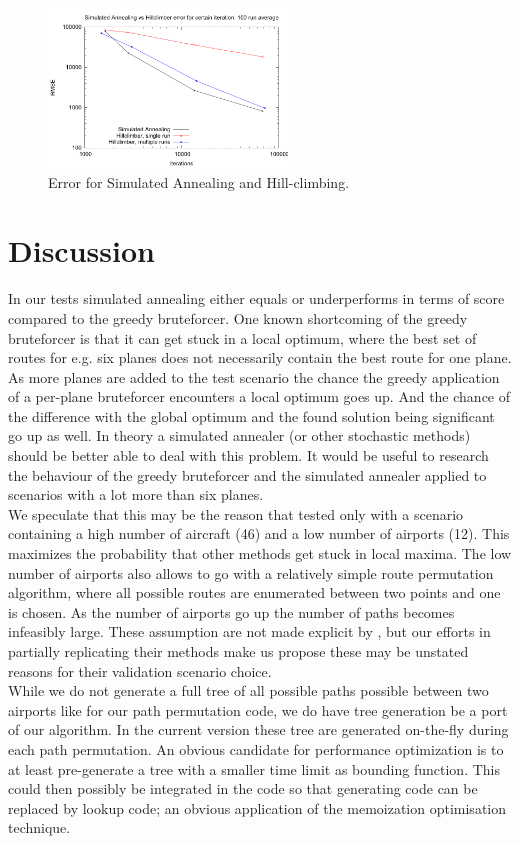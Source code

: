\documentclass[journal]{IEEEtran}
\begin{document}
\begin{figure}[H]
\centering
\includegraphics[width=2.5in]{iterations_vs_error_sa_hc}
\caption{Error for Simulated Annealing and Hill-climbing.\tiny}
\label{fig:error_sa_hc}
\end{figure}

\section{Discussion}
In our tests simulated annealing either equals or underperforms in terms of score compared to the greedy bruteforcer. One known shortcoming of the greedy bruteforcer is that it can get stuck in a local optimum, where the best set of routes for e.g. six planes does not necessarily contain the best route for one plane. As more planes are added to the test scenario the chance the greedy application of a per-plane bruteforcer encounters a local optimum goes up. And the chance of the difference with the global optimum and the found solution being significant go up as well. In theory a simulated annealer (or other stochastic methods) should be better able to deal with this problem. It would be useful to research the behaviour of the greedy bruteforcer and the simulated annealer applied to scenarios with a lot more than six planes. \\
We speculate that this may be the reason that \cite{Mashford2001} tested only with a scenario containing a high number of aircraft (46) and a low number of airports (12). This maximizes the probability that other methods get stuck in local maxima. The low number of airports also allows \cite{Mashford2001} to go with a relatively simple route permutation algorithm, where all possible routes are enumerated between two points and one is chosen. As the number of airports go up the number of paths becomes infeasibly large. These assumption are not made explicit by \cite{Mashford2001}, but our efforts in partially replicating their methods make us propose these may be unstated reasons for their validation scenario choice. \\
While we do not generate a full tree of all possible paths possible between two airports like \cite{Mashford2001} for our path permutation code, we do have tree generation be a port of our algorithm. In the current version these tree are generated on-the-fly during each path permutation. An obvious candidate for performance optimization is to at least pre-generate a tree with a smaller time limit as bounding function. This could then possibly be integrated in the code so that generating code can be replaced by lookup code; an obvious application of the memoization optimisation technique. \\
\end{document}
